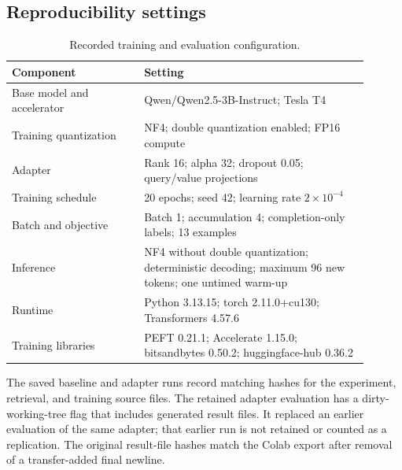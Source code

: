 \documentclass[10pt,letterpaper]{article}
\begin{document}
\subsection{Reproducibility settings}
\begin{table}[htbp]\centering\small
\caption{Recorded training and evaluation configuration.}
\begin{tabular}{P{0.33\linewidth}P{0.57\linewidth}}\toprule
Component & Setting\\\midrule
Base model and accelerator & Qwen/Qwen2.5-3B-Instruct; Tesla T4\\
Training quantization & NF4; double quantization enabled; FP16 compute\\
Adapter & Rank 16; alpha 32; dropout 0.05; query/value projections\\
Training schedule & 20 epochs; seed 42; learning rate $2\times10^{-4}$\\
Batch and objective & Batch 1; accumulation 4; completion-only labels; 13 examples\\
Inference & NF4 without double quantization; deterministic decoding; maximum 96 new tokens; one untimed warm-up\\
Runtime & Python 3.13.15; torch 2.11.0+cu130; Transformers 4.57.6\\
Training libraries & PEFT 0.21.1; Accelerate 1.15.0; bitsandbytes 0.50.2; huggingface-hub 0.36.2\\\bottomrule
\end{tabular}
\end{table}

The saved baseline and adapter runs record matching hashes for the experiment, retrieval, and training source files. The retained adapter evaluation has a dirty-working-tree flag that includes generated result files. It replaced an earlier evaluation of the same adapter; that earlier run is not retained or counted as a replication. The original result-file hashes match the Colab export after removal of a transfer-added final newline.
\end{document}
